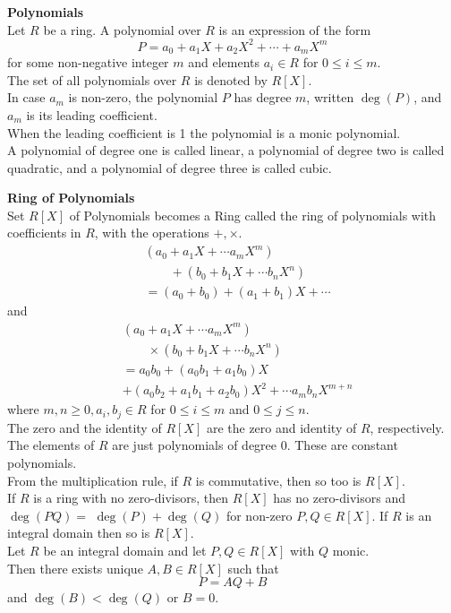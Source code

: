 \documentclass[a4paper, 10pt]{article}
\begin{document}
\begin{multicols*}{3}
\textbf{Polynomials}\\
Let $R$ be a ring. A polynomial over $R$ is an expression of the form
$$
P=a_0+a_1 X+a_2 X^2+\cdots+a_m X^m
$$
for some non-negative integer $m$ and elements $a_i \in R$ for $0 \leqslant i \leqslant m$. \\
The set of all polynomials over $R$ is denoted by $R[X]$. \\
In case $a_m$ is non-zero, the polynomial $P$ has degree $m$, written $\operatorname{deg}(P)$, and $a_m$ is its leading coefficient. \\
When the leading coefficient is 1 the polynomial is a monic polynomial.\\
A polynomial of degree one is called linear, a polynomial of degree two is called quadratic, and a polynomial of degree three is called cubic.

\textbf{Ring of Polynomials}\\
Set $R[X]$ of Polynomials becomes a Ring called the ring of polynomials with coefficients in $R$, with the operations $+, \times$.
\begin{align*}
&\left(a_0+a_1 X+\cdots a_m X^m\right)\\
&\qquad +\left(b_0+b_1 X+\cdots b_n X^n\right)\\
&=\left(a_0+b_0\right)+\left(a_1+b_1\right) X +\cdots
\end{align*}
and
\begin{align*}
&\left(a_0+a_1 X+\cdots a_m X^m\right)\\
&\qquad\times\left(b_0+b_1 X+\cdots b_n X^n\right) \\
& =a_0 b_0+\left(a_0 b_1+a_1 b_0\right) X\\
&+\left(a_0 b_2+a_1 b_1+a_2 b_0\right) X^2+\cdots a_m b_n X^{m+n}
\end{align*}
where $m, n \geqslant 0, a_i, b_j \in R$ for $0 \leqslant i \leqslant m$ and $0 \leqslant j \leqslant n$.\\
The zero and the identity of $R[X]$ are the zero and identity of $R$, respectively.\\
The elements of $R$ are just polynomials of degree 0. These are constant polynomials. \\
From the multiplication rule, if $R$ is commutative, then so too is $R[X]$.\\
If $R$ is a ring with no zero-divisors, then $R[X]$ has no zero-divisors and $\operatorname{deg}(P Q)=$ $\operatorname{deg}(P)+\operatorname{deg}(Q)$ for non-zero $P, Q \in R[X]$.
If $R$ is an integral domain then so is $R[X]$.\\
Let $R$ be an integral domain and let $P, Q \in R[X]$ with $Q$ monic. \\
Then there exists unique $A, B \in R[X]$ such that $$P=A Q+B$$ and $\operatorname{deg}(B)<\operatorname{deg}(Q)$ or $B=0$.


\end{multicols*}
\end{document}
